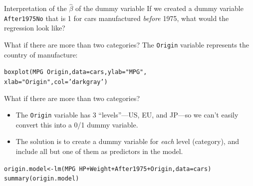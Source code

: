 \documentclass{beamer}\usepackage[]{graphicx}\usepackage[]{color}
\makeatletter
\newcommand{\hlstr}[1]{\textcolor[rgb]{1,0.894,0.71}{#1}}%
\newcommand{\hlopt}[1]{\textcolor[rgb]{1,0.894,0.769}{#1}}%
\newcommand{\hlstd}[1]{\textcolor[rgb]{1,0.894,0.769}{#1}}%
\newcommand{\hlkwb}[1]{\textcolor[rgb]{0.804,0.776,0.451}{#1}}%
\newcommand{\hlkwc}[1]{\textcolor[rgb]{0.78,0.941,0.545}{#1}}%
\newcommand{\hlkwd}[1]{\textcolor[rgb]{1,0.78,0.769}{#1}}%
\newenvironment{kframe}{%
 \def\at@end@of@kframe{}%
 \ifinner\ifhmode%
  \def\at@end@of@kframe{\end{minipage}}%
  \begin{minipage}{\columnwidth}%
 \fi\fi%
 \def\FrameCommand##1{\hskip\@totalleftmargin \hskip-\fboxsep
 \colorbox{shadecolor}{##1}\hskip-\fboxsep
     \hskip-\linewidth \hskip-\@totalleftmargin \hskip\columnwidth}%
 \MakeFramed {\advance\hsize-\width
   \@totalleftmargin\z@ \linewidth\hsize
   \@setminipage}}%
 {\par\unskip\endMakeFramed%
 \at@end@of@kframe}
\newenvironment{knitrout}{}{} %
\makeatother
\begin{document}
\begin{darkframes}
\begin{frame}[fragile]{Interpretation of the $\hat\beta$ of the dummy variable}
      If we created a dummy variable \texttt{After1975No} that is 1 for cars manufactured \emph{before} 1975, what would the regression look like?
    \end{frame}

    \begin{frame}[fragile]{What if there are more than two categories?}
      The \texttt{Origin} variable represents the country of manufacture:
\begin{knitrout}
\begin{kframe}
\begin{alltt}
\hlkwd{boxplot}\hlstd{(MPG} \hlopt{~} \hlstd{Origin,} \hlkwc{data}\hlstd{=cars,} \hlkwc{ylab}\hlstd{=}\hlstr{"MPG"}\hlstd{,}
              \hlkwc{xlab}\hlstd{=}\hlstr{"Origin"}\hlstd{,} \hlkwc{col}\hlstd{=}\hlstr{'darkgray'}\hlstd{)}
\end{alltt}
\end{kframe}


\end{knitrout}
    \end{frame}

    \begin{frame}[fragile]{What if there are more than two categories?}
      \begin{itemize}[<+->]
        \item The \texttt{Origin} variable has 3 ``levels''---US, EU, and JP---so we can't easily convert this into a 0/1 dummy variable.
        \item The solution is to create a dummy variable for \emph{each} level (category), and include \alert{all but one} of them as predictors in the model.
      \end{itemize}
    \end{frame}

    \begin{frame}[fragile]
      \fontsm\vspace{-0.15in}
\begin{knitrout}
\begin{kframe}
\begin{alltt}
\hlstd{origin.model} \hlkwb{<-} \hlkwd{lm}\hlstd{(MPG} \hlopt{~} \hlstd{HP} \hlopt{+} \hlstd{Weight} \hlopt{+} \hlstd{After1975} \hlopt{+} \hlstd{Origin,} \hlkwc{data}\hlstd{=cars)}
\hlkwd{summary}\hlstd{(origin.model)}
\end{alltt}
\begin{verbatim}


\end{verbatim}
\end{kframe}
\end{knitrout}
\end{frame}
\end{darkframes}
\end{document}
